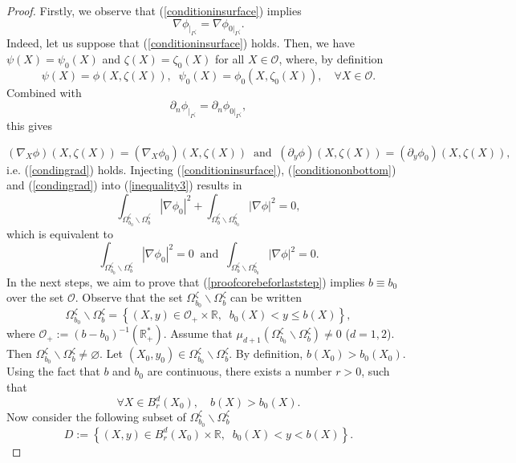 \documentclass[11pt]{article}
\begin{document}
\begin{proof}
	Firstly, we  observe that (\ref{conditioninsurface}) implies 
	\begin{equation}\label{condingrad}
		\nabla\phi_{|_{\Gamma^{\zeta}}}=\nabla\phi_{0|_{\Gamma^{\zeta}}}.
	\end{equation}
	Indeed, let us suppose that (\ref{conditioninsurface}) holds. Then, we have 
	$\psi(X)=\psi_0(X)$ and $\zeta(X)=\zeta_0(X)$ for all $X \in \mathcal O $, where, by definition
	$$\psi(X)=\phi(X,\zeta(X)),\;\; \psi_0(X)=\phi_0(X,\zeta_0(X)),\quad\forall X\in \mathcal O .$$
	Combined with $$\partial_n\phi_{|_{\Gamma^{\zeta}}}=\partial_n\phi_{0|_{\Gamma^{\zeta}}},$$ this gives 
	
	$$(\nabla_X\phi)(X,\zeta(X))=(\nabla_X\phi_0)(X,\zeta(X))\;\;\text{and}\;\;(\partial_y\phi)(X,\zeta(X))=(\partial_y\phi_0)(X,\zeta(X)),$$
	i.e. (\ref{condingrad}) holds.  Injecting (\ref{conditioninsurface}), (\ref{conditiononbottom}) and (\ref{condingrad})  into (\ref{inequality3}) results in 
	$$   \displaystyle\int_{\Omega_{b_0}^{\zeta}\backslash \Omega_{b}^{\zeta}}\left|\nabla\phi_0\right|^2+\displaystyle\int_{\Omega_{b}^{\zeta}\backslash \Omega_{b_0}^{\zeta}}\left|\nabla\phi\right|^2=0,$$
	which is equivalent to
	\begin{equation}\label{proofcorebeforlaststep}
		\displaystyle\int_{\Omega_{b_0}^{\zeta}\backslash \Omega_{b}^{\zeta}}\left|\nabla\phi_0\right|^2=0\;\;\text{and}\;\;\displaystyle\int_{\Omega_{b}^{\zeta}\backslash \Omega_{b_0}^{\zeta}}\left|\nabla\phi\right|^2=0.
	\end{equation}
	In the next steps, we aim to prove that (\ref{proofcorebeforlaststep}) implies $b\equiv b_0$ over the set $\mathcal O$. 
	Observe that the set $\Omega_{b_0}^{\zeta}\backslash \Omega_{b}^{\zeta}$ can be written
	$$\Omega_{b_0}^{\zeta}\backslash \Omega_{b}^{\zeta}=\left\{ (X,y)\in {\mathcal O} _+\times\mathbb{R},\;\; b_0(X)<y\leq b(X) \right\},$$
	where ${\mathcal O} _+:=(b-b_0)^{-1}\left(\mathbb{R}_{+}^{*}\right)$.
	Assume that $\mu_{d+1} \left(\Omega_{b_0}^{\zeta}\backslash \Omega_{b}^{\zeta}\right)\neq 0$ ($d=1,2$). Then 
	$\Omega_{b_0}^{\zeta}\backslash \Omega_{b}^{\zeta}\neq \varnothing .$ Let $(X_0,y_0) \in \Omega_{b_0}^{\zeta}\backslash \Omega_{b}^{\zeta}$. 
	By definition,  $b(X_0)>b_0(X_0)$. Using the fact that $b$ and $b_0$ are continuous, there exists a number  $r>0$, such that 
	$$\forall X\in B_r^d(X_0),\quad b(X)>b_0(X).$$
	Now consider the following subset of $\Omega_{b_0}^{\zeta}\backslash \Omega_{b}^{\zeta}$
	$$D:=\left\{ (X,y)\in B_r^d(X_0) \times\mathbb{R},\;\;   b_0(X)<y<b(X) \right\}.$$

\end{proof}
\end{document}
